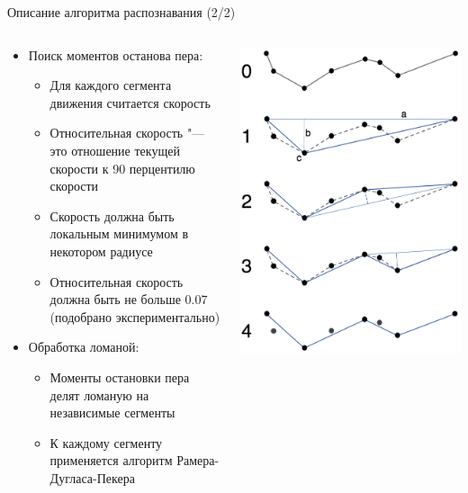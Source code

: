 \documentclass[utf8,xcolor=table]{beamer}
\begin{document}
\begin{frame}[t]{Описание алгоритма распознавания (2/2)}
  \begin{columns}[T]
  \begin{column}{.6\textwidth}
    \begin{itemize}
    \item Поиск моментов останова пера:
      \begin{itemize}
      \item Для каждого сегмента движения считается скорость
      \item Относительная скорость "--- это отношение текущей скорости к 90 перцентилю скорости
      \item Скорость должна быть локальным минимумом в некотором радиусе
      \item Относительная скорость должна быть не больше 0.07 (подобрано экспериментально)
      \end{itemize}
    \item Обработка ломаной:
      \begin{itemize}
      \item Моменты остановки пера делят ломаную на независимые сегменты
      \item К каждому сегменту применяется алгоритм Рамера-Дугласа-Пекера
      \end{itemize}
    \end{itemize}
  \end{column}
  \begin{column}{.4\textwidth}
    \includegraphics[width=\textwidth]{Douglas_Peucker}

\end{column}
\end{columns}
\end{frame}
\end{document}
